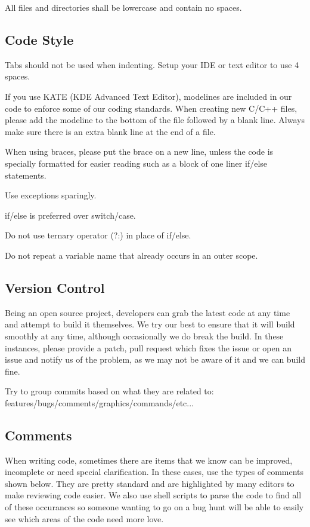 \documentclass[a4paper]{report}
\begin{document}
All files and directories shall be lowercase and contain no spaces.

\subsection{Code Style}

Tabs should not be used when indenting. Setup your IDE or text editor to use 4 spaces.

If you use KATE (KDE Advanced Text Editor), modelines are included in our code to enforce 
some of our coding standards. When creating new C/C++ files, please add
the modeline to the bottom of the file followed by a blank line. Always make sure there
is an extra blank line at the end of a file.

When using braces, please put the brace on a new line, unless the code is specially formatted
for easier reading such as a block of one liner if/else statements.

Use exceptions sparingly.

if/else is preferred over switch/case.

Do not use ternary operator (?:) in place of if/else.

Do not repeat a variable name that already occurs in an outer scope.

\subsection{Version Control}

Being an open source project, developers can grab the latest code at any time
and attempt to build it themselves. We try our best to ensure that it will build smoothly
at any time, although occasionally we do break the build. In these instances,
please provide a patch, pull request which fixes the issue or open an issue and
notify us of the problem, as we may not be aware of it and we can build fine.

Try to group commits based on what they are related to: features/bugs/comments/graphics/commands/etc...

\subsection{Comments}

When writing code, sometimes there are items that we know can be improved,
incomplete or need special clarification. In these cases, use the types of
comments shown below. They are pretty standard and are highlighted by many editors to
make reviewing code easier. We also use shell scripts to parse the code to find
all of these occurances so someone wanting to go on a bug hunt will be able to
easily see which areas of the code need more love.
\end{document}
